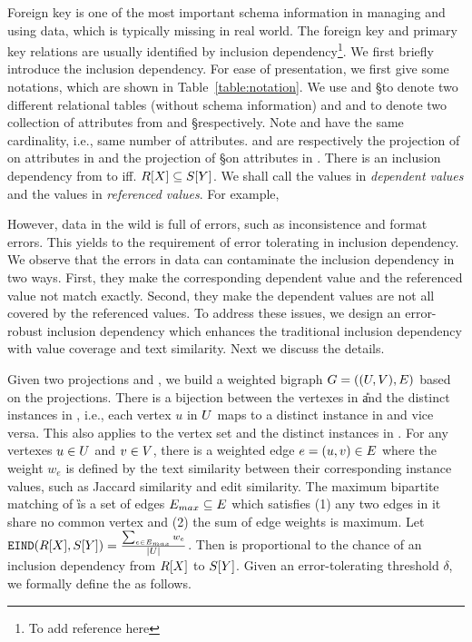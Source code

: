 Foreign key is one of the most important schema information in managing and using data, which is typically missing in real world. The foreign key and primary key relations are usually identified by inclusion dependency\footnote{To add reference here}. We first briefly introduce the inclusion dependency. For ease of presentation, we first give some notations, which are shown in Table~\ref{table:notation}. We use \R and \S to denote two different relational tables (without schema information) and \X and \Y to denote two collection of attributes from \R and \S respectively. Note \X and \Y have the same cardinality, i.e., same number of attributes. \RX and \SY are respectively the projection of \R on attributes in \X and the projection of \S on attributes in \Y. There is an inclusion dependency from \X to \Y iff. $R[X]\subseteq S[Y]$. We shall call the values in \RX \emph{dependent values} and the values in \SY \emph{referenced values}. For example, 

However, data in the wild is full of errors, such as inconsistence and format errors. This yields to the requirement of error tolerating in inclusion dependency. We observe that the errors in data can contaminate the inclusion dependency in two ways. First, they make the corresponding dependent value and the referenced value not match exactly. Second, they make the dependent values are not all covered by the referenced values. To address these issues, we design an error-robust inclusion dependency which enhances the traditional inclusion dependency with value coverage and text similarity. Next we discuss the details.


Given two projections \RX and \SY, we build a weighted bigraph $G=((U,V),E)$ based on the projections. There is a bijection between the vertexes in \U and the distinct instances in \RX, i.e., each vertex $u$ in $U$ maps to a distinct instance in \RX and vice versa. This also applies to the vertex set \V and the distinct instances in \SY. For any vertexes $u\in U$ and $v\in V$, there is a weighted edge $e=(u,v)\in E$ where the weight $w_e$ is defined by the text similarity between their corresponding instance values, such as Jaccard similarity and edit similarity. The maximum bipartite matching of \G is a set of edges $E_{max}\subseteq E$ which satisfies (1) any two edges in it share no common vertex and (2) the sum of edge weights is maximum. Let $\texttt{EIND}(R[X],S[Y])=\frac{\sum_{e\in E_{max}}w_e}{|U|}$. Then \EIND is proportional to the chance of an inclusion dependency from $R[X]$ to $S[Y]$. Given an error-tolerating threshold $\delta$, we formally define the \eind as follows.

